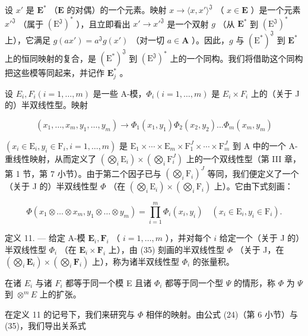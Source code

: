 设 \(x'\) 是 \(\mathbf{E}^*\) （\(\mathbf{E}\) 的对偶）的一个元素。映射 \(x \to \langle x, x' \rangle^{\mathfrak{J}}\) （ \(x \in \mathbf{E}\) ）是一个元素 \(x'^{\mathfrak{J}}\) （属于 \((\mathrm{E}^{\mathfrak{J}})^*\) ），且立即看出 \(x' \to x'^{\mathfrak{J}}\) 是一个双射 \(g\) （从 \(\mathbf{E}^*\) 到 \((\mathrm{E}^{\mathfrak{J}})^*\) 上），它满足 \(g(ax') = a^{\mathfrak{J}}g(x')\) （对一切 \(a \in \mathbf{A}\) ）。因此，\(g\) 与 \((\mathrm{E}^*)^{\mathfrak{J}}\) 到 \(\mathbf{E}^*\) 上的恒同映射的复合，是 \((\mathrm{E}^*)^{\mathfrak{J}}\) 到 \((\mathrm{E}^{\mathfrak{J}})^*\) 上的一个同构。我们将借助这个同构把这些模等同起来，并记作 \(\mathbf{E}_j^*\) 。

设 \(E_{i}, F_{i} (i = 1, \ldots, m)\) 是一些 A-模，\(\Phi_{i} (i = 1, \ldots, m)\) 是 \(E_{i} \times F_{i}\) 上的（关于 J 的）半双线性型。映射

\[
(x _ {1}, \dots , x _ {m}, y _ {1}, \dots , y _ {m}) \rightarrow \Phi_ {1} (x _ {1}, y _ {1}) \Phi_ {2} (x _ {2}, y _ {2}) \dots \Phi_ {m} (x _ {m}, y _ {m})
\]

\((x_{i} \in \mathrm{E}_{i}, y_{i} \in \mathrm{F}_{i}, i = 1, \ldots, m)\) 是 \(\mathrm{E}_{1} \times \cdots \times \mathrm{E}_{m} \times \mathrm{F}_{1}^{J} \times \cdots \times \mathrm{F}_{m}^{J}\) 到 A 中的一个 A-重线性映射，从而定义了 \((\bigotimes_{i} \mathrm{E}_{i}) \times (\bigotimes_{i} \mathrm{F}_{i}^{J})\) 上的一个双线性型（第 III 章，第 1 节，第 7 小节）。由于第二个因子已与 \((\bigotimes_{i} \mathrm{F}_{i})^{J}\) 等同，我们便定义了一个（关于 J 的）半双线性型 \(\Phi\) （在 \((\bigotimes_{i} \mathrm{E}_{i}) \times (\bigotimes_{i} \mathrm{F}_{i})\) 上）。它由下式刻画：

\[
\Phi (x _ {1} \otimes \dots \otimes x _ {m}, y _ {1} \otimes \dots \otimes y _ {m}) = \prod_ {i = 1} ^ {m} \Phi_ {i} (x _ {i}, y _ {i}) \quad (x _ {i} \in \mathrm{E} _ {i}, y _ {i} \in \mathrm{F} _ {i}).\tag{35}
\]

定义 11. --- 给定 A-模 \(\mathbf{E}_{i}, \mathbf{F}_{i}\) （ \(i=1,\ldots,m\) ），并对每个 \(i\) 给定一个（关于 J 的）半双线性型 \(\Phi_{i}\) （在 \(\mathbf{E}_{i} \times \mathbf{F}_{i}\) 上），由 (35) 刻画的半双线性型 \(\Phi\) （关于 J，在 \((\bigotimes_{i}\mathbf{E}_{i}) \times (\bigotimes_{i}\mathbf{F}_{i})\) 上），称为诸半双线性型 \(\Phi_{i}\) 的张量积。

在诸 \(E_{i}\) 与诸 \(F_{i}\) 都等于同一个模 E 且诸 \(\Phi_{i}\) 都等于同一个型 \(\Psi\) 的情形，称 \(\Phi\) 为 \(\Psi\) 到 \(\otimes^{m}E\) 上的扩张。

在定义 11 的记号下，我们来研究与 \(\Phi\) 相伴的映射。由公式 (24)（第 6 小节）与 (35)，我们导出关系式

